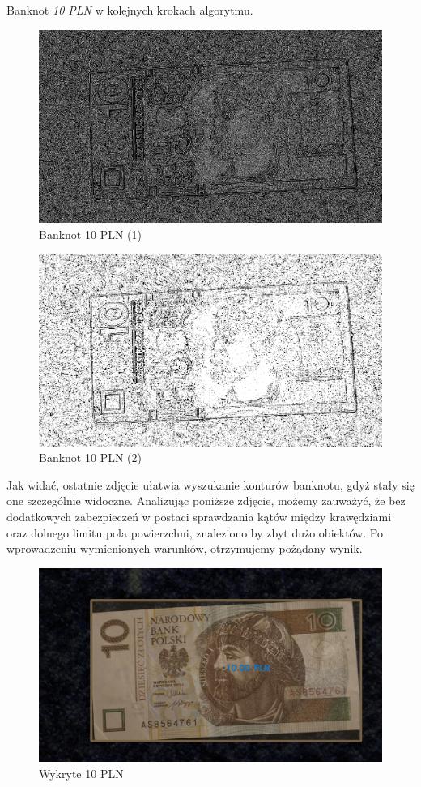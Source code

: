 \documentclass{mwart}
\begin{document}
Banknot \textit{10 PLN} w kolejnych krokach algorytmu.
\begin{figure}[H]
    \centering
    \includegraphics[width=\textwidth]{Gray_10_before.png}
    \caption{Banknot 10 PLN (1)}
\end{figure}

\begin{figure}[H]
    \centering
    \includegraphics[width=\textwidth]{Gray_10_after.png}
    \caption{Banknot 10 PLN (2)}
\end{figure}

Jak widać, ostatnie zdjęcie ułatwia wyszukanie konturów banknotu, gdyż stały się one szczególnie widoczne. Analizując poniższe zdjęcie, możemy zauważyć, że bez dodatkowych zabezpieczeń w postaci sprawdzania kątów między krawędziami oraz dolnego limitu pola powierzchni, znaleziono by zbyt dużo obiektów. Po wprowadzeniu wymienionych warunków, otrzymujemy pożądany wynik.

\begin{figure}[H]
    \centering
    \includegraphics[width=\textwidth]{Single_10_PLN.png}
    \caption{Wykryte 10 PLN}
\end{figure}
\end{document}
